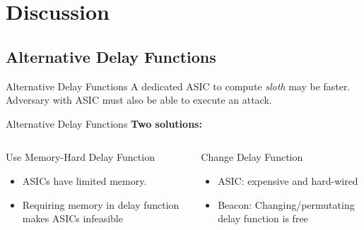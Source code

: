 \section{Discussion}


\subsection{Alternative Delay Functions}

\begin{frame}{Alternative Delay Functions}
    \centering
    A dedicated ASIC to compute \emph{sloth} may be faster.
    \\
    \vspace{1cm}
    Adversary with ASIC must also be able to execute an attack.
\end{frame}

\begin{frame}{Alternative Delay Functions}
    \centering
    \textbf{Two solutions:}

    \vspace{.5cm}
    
    \begin{columns}[T, onlytextwidth]
        \begin{block}{Use Memory-Hard Delay Function}
            \begin{itemize}
                \item ASICs have limited memory.
                \item Requiring memory in delay function makes ASICs infeasible
            \end{itemize}
        \end{block}

        \begin{block}{Change Delay Function}
            \begin{itemize}
                \item ASIC: expensive and hard-wired
                \item Beacon: Changing/permutating delay function is free
            \end{itemize}
        \end{block}
    \end{columns}
\end{frame}


